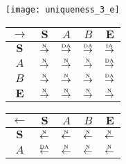 \begin{figure}[htbp]\ContinuedFloat
  \centering
  \begin{subfigure}{1\textwidth}
    \centering
    \begin{minipage}[b]{1\textwidth}
      \centering
      \texttt{[image: uniqueness\_3\_e]}
    \end{minipage}
    \begin{minipage}[b]{0.3\textwidth}
      \vspace{1em}
      \centering
      \begin{tabular}{|c|c|c|c|c|} \hline
        $\rightarrow$ & $\bm{S}$ & $A$ & $B$ & $\bm{E}$\\ \hline
        $\bm{S}$ & $\overset{\text{\tiny{N}}}{\rightarrow}$ & $\overset{\text{\tiny{DA}}}{\rightarrow}$ & $\overset{\text{\tiny{DA}}}{\rightarrow}$ & $\overset{\text{\tiny{IA}}}{\rightarrow}$\\ \hline
        $A$ & $\overset{\text{\tiny{N}}}{\rightarrow}$ & $\overset{\text{\tiny{N}}}{\rightarrow}$ & $\overset{\text{\tiny{N}}}{\rightarrow}$ & $\overset{\text{\tiny{DA}}}{\rightarrow}$\\ \hline
        $B$ & $\overset{\text{\tiny{N}}}{\rightarrow}$ & $\overset{\text{\tiny{N}}}{\rightarrow}$ & $\overset{\text{\tiny{N}}}{\rightarrow}$ & $\overset{\text{\tiny{DA}}}{\rightarrow}$\\ \hline
        $\bm{E}$ & $\overset{\text{\tiny{N}}}{\rightarrow}$ & $\overset{\text{\tiny{N}}}{\rightarrow}$ & $\overset{\text{\tiny{N}}}{\rightarrow}$ & $\overset{\text{\tiny{N}}}{\rightarrow}$\\ \hline
      \end{tabular}
    \end{minipage}
    \begin{minipage}[b]{0.3\textwidth}
      \vspace{1em}
      \centering
      \begin{tabular}{|c|c|c|c|c|} \hline
        $\leftarrow$ & $\bm{S}$ & $A$ & $B$ & $\bm{E}$\\ \hline
        $\bm{S}$ & $\overset{\text{\tiny{N}}}{\leftarrow}$ & $\overset{\text{\tiny{N}}}{\leftarrow}$ & $\overset{\text{\tiny{N}}}{\leftarrow}$ & $\overset{\text{\tiny{N}}}{\leftarrow}$\\ \hline
        $A$ & $\overset{\text{\tiny{DA}}}{\leftarrow}$ & $\overset{\text{\tiny{N}}}{\leftarrow}$ & $\overset{\text{\tiny{N}}}{\leftarrow}$ & $\overset{\text{\tiny{N}}}{\leftarrow}$\\ \hline

\end{tabular}
\end{minipage}
\end{subfigure}
\end{figure}

